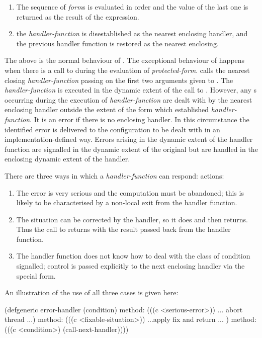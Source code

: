 \begin{optDefinition}
\begin{enumerate}
    \item The sequence of {\em form}s is evaluated in order and the value of the
    last one is returned as the result of the 
    expression.

    \item the {\em handler-function} is disestablished as the nearest enclosing
    handler, and the previous handler function is restored as the nearest
    enclosing.
\end{enumerate}
%
The above is the normal behaviour of .  The exceptional
behaviour of  happens when there is a call to
 during the evaluation of {\em protected-form}.
 calls the nearest closing {\em handler-function} passing on
the first two arguments given to .  The {\em
    handler-function} is executed in the dynamic extent of the call to
.  However, any s occurring during the
execution of {\em handler-function} are dealt with by the nearest enclosing
handler outside the extent of the form which established {\em handler-function}.
It is an error if there is no enclosing handler. In this circumstance the
identified error is delivered to the configuration to be dealt with in an
implementation-defined way. Errors arising in the dynamic extent of the handler
function are signalled in the dynamic extent of the original
 but are handled in the enclosing dynamic extent of the
handler.

\examples
%
There are three ways in which a {\em handler-function} can respond:
actions:
\begin{enumerate}
    \item The error is very serious and the computation must be abandoned; this
    is likely to be characterised by a non-local exit from the handler
    function.

    \item The situation can be corrected by the handler, so it does and then
    returns. Thus the call to  returns with the result
    passed back from the handler function.

    \item The handler function does not know how to deal with the class of
    condition signalled; control is passed explicitly to the next enclosing
    handler via the  special form.
\end{enumerate}
%
An illustration of the use of all three cases is given here:
%
\begin{example}
\label{example:with-handler}
{\small\syntax
(defgeneric error-handler (condition)
   method: (((c <serious-error>)) ... abort thread ...)
   method: (((c <fixable-situation>)) ...apply fix and return ... )
   method: (((c <condition>) (call-next-handler))))

}
\end{example}
\end{optDefinition}
